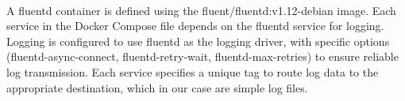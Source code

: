 \paragraph{} A fluentd container is defined using the fluent/fluentd:v1.12-debian image. Each service in the Docker Compose file depends on the fluentd service for logging. Logging is configured to use fluentd as the logging driver, with specific options (fluentd-async-connect, fluentd-retry-wait, fluentd-max-retries) to ensure reliable log transmission. Each service specifies a unique tag to route log data to the appropriate destination, which in our case are simple log files.